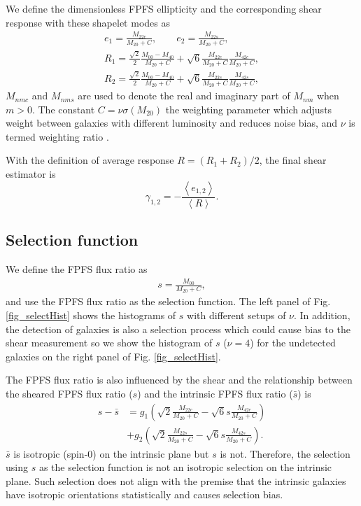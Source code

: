 We define the dimensionless FPFS ellipticity and the corresponding shear
response with these shapelet modes as
\begin{align}\label{ellipticity_define}
e_1=\frac{M_{22c}}{M_{20}+C},\qquad
e_2=\frac{M_{22s}}{M_{20}+C},\\
R_{1}=\frac{\sqrt{2}}{2}\frac{M_{00}-M_{40}}{M_{20}+C}
    +\sqrt{6}\frac{M_{22c}}{M_{20}+C}\frac{M_{42c}}{M_{20}+C},\\
R_{2}=\frac{\sqrt{2}}{2}\frac{M_{00}-M_{40}}{M_{20}+C}
    +\sqrt{6}\frac{M_{22s}}{M_{20}+C}\frac{M_{42s}}{M_{20}+C},
\end{align}
$M_{nmc}$ and $M_{nms}$ are used to denote the real and imaginary part of
$M_{nm}$ when $m>0$. The constant $C=\nu \sigma(M_{20})$ the weighting
parameter which adjusts weight between galaxies with different luminosity and
reduces noise bias, and $\nu$ is termed weighting ratio \citep{FPFS-Li2018}.

With the definition of average response $R= (R_1+R_2)/2$, the final shear
estimator is
\begin{equation}
\gamma_{1,2} =-\frac{\left\langle e_{1,2}
\right\rangle}{\left\langle R \right\rangle}.
\end{equation}

\subsection{Selection function}
\label{sec_Method_select}

We define the FPFS flux ratio as
\begin{align}\label{select_define}
s = \frac{M_{00}}{M_{20}+C},
\end{align}
and use the FPFS flux ratio as the selection function.
The left panel of Fig. \ref{fig_selectHist} shows the histograms of $s$ with
different setups of $\nu$. In addition, the detection of galaxies is also a
selection process which could cause bias to the shear measurement so we show
the histogram of $s$ ($\nu=4$) for the undetected galaxies on the right panel
of Fig. \ref{fig_selectHist}.

The FPFS flux ratio is also influenced by the shear and the relationship
between the sheared FPFS flux ratio ($s$) and the intrinsic FPFS flux ratio
($\bar{s}$) is
\begin{align}\label{select_transform}
s-\bar{s} &=g_1 (\sqrt{2}\frac{M_{22c}}{M_{20}+C}
    -\sqrt{6}s\frac{M_{42c}}{M_{20}+C}) \\
    &+g_2 (\sqrt{2}\frac{M_{22s}}{M_{20}+C}
    -\sqrt{6}s\frac{M_{42s}}{M_{20}+C}).
\end{align}
$\bar{s}$ is isotropic (spin-0) on the intrinsic plane but $s$ is not.
Therefore, the selection using $s$ as the selection function is not an
isotropic selection on the intrinsic plane. Such selection does not align with
the premise that the intrinsic galaxies have isotropic orientations
statistically and causes selection bias.


